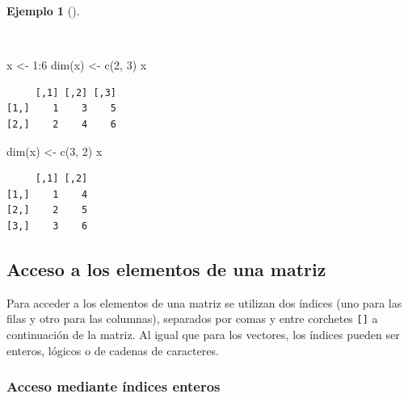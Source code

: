 \documentclass[
  a4paper,
]{scrreport}
\newenvironment{Shaded}{\begin{snugshade}}{\end{snugshade}}
\newcommand{\DecValTok}[1]{\textcolor[rgb]{0.68,0.00,0.00}{#1}}
\newcommand{\FunctionTok}[1]{\textcolor[rgb]{0.28,0.35,0.67}{#1}}
\newcommand{\NormalTok}[1]{\textcolor[rgb]{0.00,0.23,0.31}{#1}}
\newcommand{\OtherTok}[1]{\textcolor[rgb]{0.00,0.23,0.31}{#1}}
\newcommand{\SpecialCharTok}[1]{\textcolor[rgb]{0.37,0.37,0.37}{#1}}
\theoremstyle{definition}
\theoremstyle{definition}
\newtheorem{example}{Ejemplo}[chapter]
\theoremstyle{remark}
\begin{document}
\begin{example}[]\protect\hypertarget{exm-modificacion-dimensiones-matriz}{}\label{exm-modificacion-dimensiones-matriz}

~

\begin{Shaded}
\begin{Highlighting}[]
\NormalTok{x }\OtherTok{\textless{}{-}} \DecValTok{1}\SpecialCharTok{:}\DecValTok{6}
\FunctionTok{dim}\NormalTok{(x) }\OtherTok{\textless{}{-}} \FunctionTok{c}\NormalTok{(}\DecValTok{2}\NormalTok{, }\DecValTok{3}\NormalTok{)}
\NormalTok{x}
\end{Highlighting}
\end{Shaded}

\begin{verbatim}
     [,1] [,2] [,3]
[1,]    1    3    5
[2,]    2    4    6
\end{verbatim}

\begin{Shaded}
\begin{Highlighting}[]
\FunctionTok{dim}\NormalTok{(x) }\OtherTok{\textless{}{-}} \FunctionTok{c}\NormalTok{(}\DecValTok{3}\NormalTok{, }\DecValTok{2}\NormalTok{)}
\NormalTok{x}
\end{Highlighting}
\end{Shaded}

\begin{verbatim}
     [,1] [,2]
[1,]    1    4
[2,]    2    5
[3,]    3    6
\end{verbatim}

\end{example}

\hypertarget{acceso-a-los-elementos-de-una-matriz}{%
\subsection{Acceso a los elementos de una
matriz}\label{acceso-a-los-elementos-de-una-matriz}}

Para acceder a los elementos de una matriz se utilizan dos índices (uno
para las filas y otro para las columnas), separados por comas y entre
corchetes \texttt{{[}{]}} a continuación de la matriz. Al igual que para
los vectores, los índices pueden ser enteros, lógicos o de cadenas de
caracteres.

\hypertarget{acceso-mediante-uxedndices-enteros}{%
\subsubsection{Acceso mediante índices
enteros}\label{acceso-mediante-uxedndices-enteros}}
\end{document}
